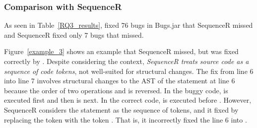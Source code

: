 \subsubsection{\bf Comparison with SequenceR}

As seen in Table~\ref{RQ3_results}, {\tool} fixed 76 bugs in Bugs.jar
that SequenceR missed and SequenceR fixed only 7 bugs that
{\tool} missed.

Figure~\ref{example_3} shows an example that SequenceR missed, but was
fixed correctly by {\tool}. Despite considering the context, {\em
  SequenceR treats source code as a sequence of code tokens}, not
well-suited for structural changes. The fix from line 6 into line 7
involves structural changes to the AST of the statement at line 6
because the order of two operations  and \code{\%} is
reversed. In the buggy code,  is executed first and then
\code{\%} is next. In the correct code, \code{\%} is executed before
.
However, SequenceR considers the statement as the sequence of tokens,
and it fixed by replacing the token  with the token
. That is, it incorrectly fixed the line 6 into
   
\code{\%} .


